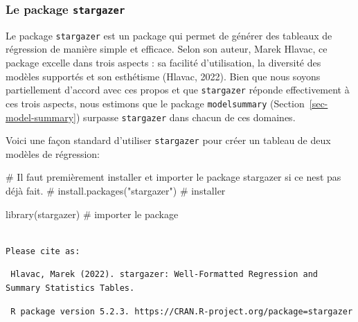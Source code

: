 \documentclass[
  letterpaper,
  DIV=11,
  numbers=noendperiod]{scrreprt}
\newenvironment{Shaded}{\begin{snugshade}}{\end{snugshade}}
\newcommand{\CommentTok}[1]{\textcolor[rgb]{0.37,0.37,0.37}{#1}}
\newcommand{\FunctionTok}[1]{\textcolor[rgb]{0.28,0.35,0.67}{#1}}
\newcommand{\NormalTok}[1]{\textcolor[rgb]{0.00,0.23,0.31}{#1}}
\begin{document}
\hypertarget{le-package-stargazer}{%
\subsubsection{\texorpdfstring{Le package
\texttt{stargazer}}{Le package stargazer}}\label{le-package-stargazer}}

Le package \texttt{stargazer} est un package qui permet de générer des
tableaux de régression de manière simple et efficace. Selon son auteur,
Marek Hlavac, ce package excelle dans trois aspects : sa facilité
d'utilisation, la diversité des modèles supportés et son esthétisme
(Hlavac, 2022). Bien que nous soyons partiellement d'accord avec ces
propos et que \texttt{stargazer} réponde effectivement à ces trois
aspects, nous estimons que le package \texttt{modelsummary}
(Section~\ref{sec-model-summary}) surpasse \texttt{stargazer} dans
chacun de ces domaines.

Voici une façon standard d'utiliser \texttt{stargazer} pour créer un
tableau de deux modèles de régression:

\begin{Shaded}
\begin{Highlighting}[]
\CommentTok{\# Il faut premièrement installer et importer le package stargazer si ce n\textquotesingle{}est pas déjà fait.}
\CommentTok{\# install.packages("stargazer") \# installer}

\FunctionTok{library}\NormalTok{(stargazer) }\CommentTok{\# importer le package}
\end{Highlighting}
\end{Shaded}

\begin{verbatim}

Please cite as: 
\end{verbatim}

\begin{verbatim}
 Hlavac, Marek (2022). stargazer: Well-Formatted Regression and Summary Statistics Tables.
\end{verbatim}

\begin{verbatim}
 R package version 5.2.3. https://CRAN.R-project.org/package=stargazer 
\end{verbatim}
\end{document}
